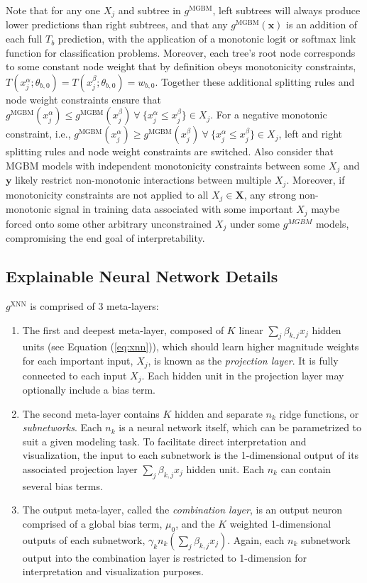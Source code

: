 \documentclass[information,article,accept,moreauthors,pdftex]{Definitions/mdpi}
\begin{document}
{ Note that for any one $X_j$ and subtree in $g^{\text{MGBM}}$, left subtrees will always produce lower predictions than right subtrees, and that any $g^{\text{MGBM}}(\mathbf{x})$ is an addition of each full $T_b$ prediction, with the application of a monotonic logit or softmax link function for classification problems. Moreover, each tree's root node corresponds to some constant node weight that by definition obeys monotonicity constraints, $ T(x^{\alpha}_j; \theta_{b,0}) = T(x^{\beta}_j; \theta_{b,0}) = w_{b,0}$. Together these additional splitting rules and node weight constraints ensure that $g^{\text{MGBM}}(x^{\alpha}_j) \le g^{\text{MGBM}}(x^{\beta}_j) ~\forall~ \{x^{\alpha}_j \le x^{\beta}_j\} \in X_j$. For a negative monotonic constraint, i.e., $g^{\text{MGBM}}(x^{\alpha}_j)  \ge g^{\text{MGBM}}(x^{\beta}_j) ~\forall~ \{x^{\alpha}_j \le x^{\beta}_j\} \in X_j$, left and right splitting rules and node weight constraints are switched. Also consider that MGBM models with independent monotonicity constraints between some $X_j$ and $\mathbf{y}$ likely restrict non-monotonic interactions between multiple $X_j$. Moreover, if monotonicity constraints are not applied to all $X_j \in \mathbf{X}$, any strong non-monotonic signal in training data associated with some important $X_j$ maybe forced onto some other arbitrary unconstrained $X_j$ under some $g^{MGBM}$ models, compromising the end goal of interpretability.

\subsection{Explainable Neural Network Details}\label{a_ssec:xnn}

 

 $g^{\text{XNN}}$ is comprised of 3 meta-layers:

\begin{enumerate}[leftmargin=*,labelsep=4.9mm]
	\item The first and deepest meta-layer, composed of $K$ linear $\sum_j\beta_{k,j}x_j$ hidden units (see Equation (\ref{eq:xnn})), which should learn higher magnitude weights for each important input, $X_j$, is known as the \textit{projection layer}. It is fully connected to each input $X_j$. Each hidden unit in the projection layer may optionally include a bias term.
	\item The second meta-layer contains $K$ hidden and separate $n_k$ ridge functions, or \textit{subnetworks}. Each $n_k$ is a neural network itself, which can be parametrized to suit a given modeling task. To facilitate direct interpretation and visualization, the input to each subnetwork is the 1-dimensional output of its associated projection layer $\sum_j\beta_{k,j}x_j$ hidden unit. Each $n_k$ can contain several bias terms.
	\item The output meta-layer, called the \textit{combination layer}, is an output neuron comprised of a global bias term, $\mu_0$, and the $K$ weighted 1-dimensional outputs of each subnetwork, $\gamma_kn_k(\sum_j\beta_{k,j}x_j)$. Again, each $n_k$ subnetwork output into the combination layer is restricted to 1-dimension for interpretation and visualization purposes.
\end{enumerate}

}
\end{document}
